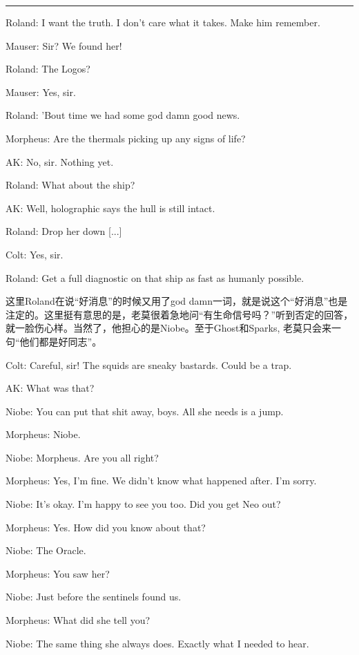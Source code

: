 \documentclass[UTF8]{ctexart}
\newcommand{\myparsep}{\noindent \rule[0.5ex]{\linewidth}{1pt}}
\newenvironment{myquote}{\color{green} \setlength{\leftskip}{6em} \setlength{\rightskip}{4em} \setlength{\parindent}{-2em}}{\par}
\begin{document}
\myparsep

\begin{myquote}
Roland: I want the truth. I don't care what it takes. Make him remember.

Mauser: Sir? We found her!

Roland: The Logos?

Mauser: Yes, sir.

Roland: 'Bout time we had some god damn good news.

Morpheus: Are the thermals picking up any signs of life?

AK: No, sir. Nothing yet.

Roland: What about the ship?

AK: Well, holographic says the hull is still intact.

Roland: Drop her down [...]

Colt: Yes, sir.

Roland: Get a full diagnostic on that ship as fast as humanly possible.
\end{myquote}

这里Roland在说“好消息”的时候又用了god damn一词，就是说这个“好消息”也是注定的。这里挺有意思的是，老莫很着急地问“有生命信号吗？”听到否定的回答，就一脸伤心样。当然了，他担心的是Niobe。至于Ghost和Sparks, 老莫只会来一句“他们都是好同志”。

\begin{myquote}
Colt: Careful, sir! The squids are sneaky bastards. Could be a trap.

AK: What was that?

Niobe: You can put that shit away, boys. All she needs is a jump.

Morpheus: Niobe.

Niobe: Morpheus. Are you all right?

Morpheus: Yes, I'm fine. We didn't know what happened after. I'm sorry.

Niobe: It's okay. I'm happy to see you too. Did you get Neo out?

Morpheus: Yes. How did you know about that?

Niobe: The Oracle.

Morpheus: You saw her?

Niobe: Just before the sentinels found us.

Morpheus: What did she tell you?

Niobe: The same thing she always does. Exactly what I needed to hear.
\end{myquote}
\end{document}
